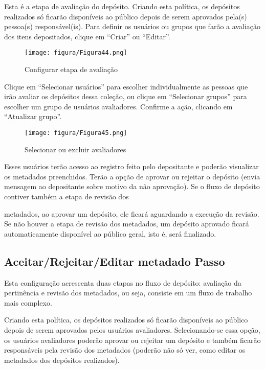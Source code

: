 \documentclass[12pt,hidelinks]{article}
\begin{document}
    Esta é a etapa de avaliação do depósito. Criando esta política, os depósitos realizados só ficarão disponíveis ao público depois de serem aprovados pela(s) pessoa(s) responsável(is). Para definir os usuários ou grupos que farão a avaliação dos itens depositados, clique em “Criar” ou “Editar”.
    
    \begin{figure}[!htp]
                \centering
                \texttt{[image: figura/Figura44.png]}
                \caption{Configurar etapa de avaliação}
            \label{Rotulo}
        \end{figure}
        
    Clique em “Selecionar usuários” para escolher individualmente as pessoas que irão avaliar os depósitos dessa coleção, ou clique em “Selecionar grupos” para escolher um grupo de usuários avaliadores. Confirme a ação, clicando em “Atualizar grupo”.
    
    \begin{figure}[!htp]
                \centering
                \texttt{[image: figura/Figura45.png]}
                \caption{Selecionar ou excluir avaliadores}
            \label{Rotulo}
        \end{figure}
        
    Esses usuários terão acesso ao registro feito pelo depositante e poderão visualizar os metadados preenchidos. Terão a opção de aprovar ou rejeitar o depósito (envia mensagem ao depositante sobre motivo da não aprovação). Se o fluxo de depósito contiver também a etapa de revisão dos

\newpage

    metadados, ao aprovar um depósito, ele ficará aguardando a execução da revisão. Se não houver a etapa de revisão dos metadados, um depósito aprovado ficará automaticamente disponível ao público geral, isto é, será finalizado.
    
    \subsection{Aceitar/Rejeitar/Editar metadado Passo}
    
    Esta configuração acrescenta duas etapas no fluxo de depósito: avaliação da pertinência e revisão dos metadados, ou seja, consiste em um fluxo de trabalho mais complexo.
    
    \singlespacing
    
    Criando esta política, os depósitos realizados só ficarão disponíveis ao público depois de serem aprovados pelos usuários avaliadores. Selecionando-se essa opção, os usuários avaliadores poderão aprovar ou rejeitar um depósito e também ficarão responsáveis pela revisão dos metadados (poderão não só ver, como editar os metadados dos depósitos realizados).
    
\end{document}
